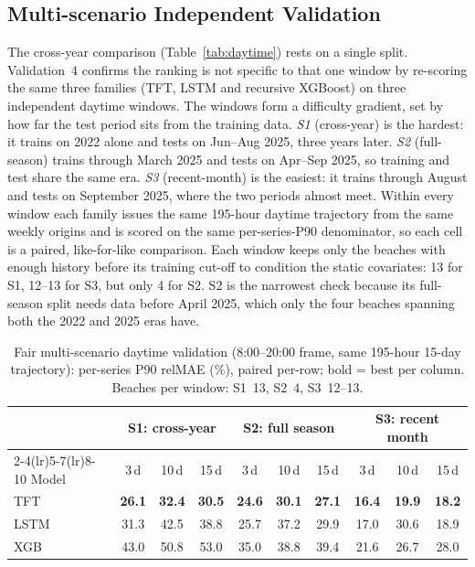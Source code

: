 \documentclass[twocolumn,twoside,a4paper,10pt]{IEEEtran}
\begin{document}
\subsection{Multi-scenario Independent Validation}\label{sec:a2}

The cross-year comparison (Table~\ref{tab:daytime}) rests on a single split. Validation~4 confirms the ranking is not specific to that one window by re-scoring the same three families (TFT, LSTM and recursive XGBoost) on three independent daytime windows. The windows form a difficulty gradient, set by how far the test period sits from the training data. \emph{S1} (cross-year) is the hardest: it trains on 2022 alone and tests on Jun--Aug 2025, three years later. \emph{S2} (full-season) trains through March 2025 and tests on Apr--Sep 2025, so training and test share the same era. \emph{S3} (recent-month) is the easiest: it trains through August and tests on September 2025, where the two periods almost meet. Within every window each family issues the same 195-hour daytime trajectory from the same weekly origins and is scored on the same per-series-P90 denominator, so each cell is a paired, like-for-like comparison. Each window keeps only the beaches with enough history before its training cut-off to condition the static covariates: 13 for S1, 12--13 for S3, but only 4 for S2. S2 is the narrowest check because its full-season split needs data before April 2025, which only the four beaches spanning both the 2022 and 2025 eras have.

\begin{table}[!t]
    \caption{Fair multi-scenario daytime validation (8:00--20:00 frame, same 195-hour 15-day trajectory): per-series P90 relMAE (\%), paired per-row; bold = best per column. Beaches per window: S1~13, S2~4, S3~12--13.}
    \label{tab:a2}
    \begin{center}
    \footnotesize
    \begin{tabular}{l ccc ccc ccc}
        \toprule
        & \multicolumn{3}{c}{S1: cross-year} & \multicolumn{3}{c}{S2: full season} & \multicolumn{3}{c}{S3: recent month} \\
        \cmidrule(lr){2-4}\cmidrule(lr){5-7}\cmidrule(lr){8-10}
        Model & 3\,d & 10\,d & 15\,d & 3\,d & 10\,d & 15\,d & 3\,d & 10\,d & 15\,d \\
        \midrule
        TFT  & \textbf{26.1} & \textbf{32.4} & \textbf{30.5} & \textbf{24.6} & \textbf{30.1} & \textbf{27.1} & \textbf{16.4} & \textbf{19.9} & \textbf{18.2} \\
        LSTM & 31.3 & 42.5 & 38.8 & 25.7 & 37.2 & 29.9 & 17.0 & 30.6 & 18.9 \\
        XGB  & 43.0 & 50.8 & 53.0 & 35.0 & 38.8 & 39.4 & 21.6 & 26.7 & 28.0 \\
        \bottomrule
    \end{tabular}
    \end{center}
\end{table}
\end{document}
